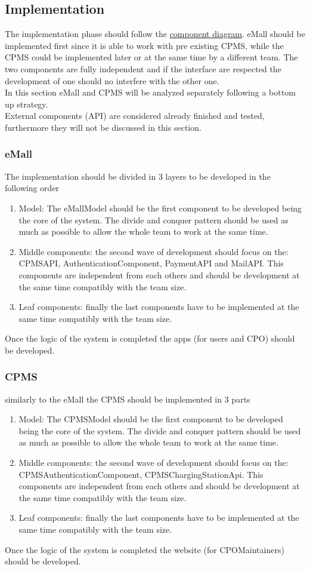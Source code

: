 \subsection{Implementation}
The implementation phase should follow the \hyperref[fig:eMSP-component]{component diagram}. \ac{eMall} should be implemented first since it is able to work with pre existing \ac{CPMS}, while the \ac{CPMS} could be implemented later or at the same time by a different team. The two components are fully independent and if the interface are respected the development of one should no interfere with the other one.\\
In this section \ac{eMall} and \ac{CPMS} will be analyzed separately following a bottom up strategy.\\
External components (\ac{API}) are considered already finished and tested, furthermore they will not be discussed in this section.
\subsubsection{eMall}
The implementation should be divided in 3 layers to be developed in the following order
\begin{enumerate}
    \item Model: The eMallModel should be the first component to be developed being the core of the system. The divide and conquer pattern should be used as much as possible to allow the whole team to work at the same time.
    \item Middle components: the second wave of development should focus on the: CPMSAPI, AuthenticationComponent, PaymentAPI and MailAPI. This components are independent from each others and should be development at the same time compatibly with the team size.
    \item Leaf components: finally the last components have to be implemented at the same time compatibly with the team size.
\end{enumerate}
Once the logic of the system is completed the apps (for users and \ac{CPO}) should be developed.
\subsubsection{CPMS}
similarly to the \ac{eMall} the \ac{CPMS} should be implemented in 3 parts
\begin{enumerate}
    \item Model: The CPMSModel should be the first component to be developed being the core of the system. The divide and conquer pattern should be used as much as possible to allow the whole team to work at the same time.
    \item Middle components: the second wave of development should focus on the: CPMSAuthenticationComponent, CPMSChargingStationApi. This components are independent from each others and should be development at the same time compatibly with the team size.
    \item Leaf components: finally the last components have to be implemented at the same time compatibly with the team size.
\end{enumerate}
Once the logic of the system is completed the website (for \ac{CPO}Maintainers) should be developed.

